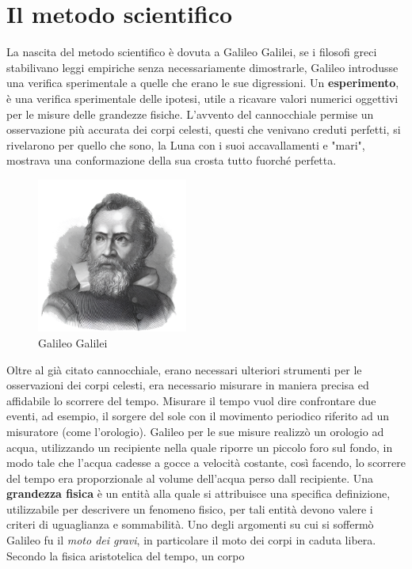 \documentclass[10pt, letterpaper]{report}
\begin{document}
\section{Il metodo scientifico}
La nascita del metodo scientifico è dovuta a Galileo Galilei, se i filosofi greci stabilivano 
leggi empiriche senza necessariamente dimostrarle, Galileo introdusse una verifica sperimentale 
a quelle che erano le sue digressioni.\acc 
Un \textbf{esperimento}, è una verifica sperimentale delle ipotesi, utile a ricavare valori 
numerici oggettivi per le misure delle grandezze fisiche. L'avvento del cannocchiale permise un 
osservazione più accurata dei corpi celesti, questi che venivano creduti perfetti, si rivelarono 
per quello che sono, la Luna con i suoi accavallamenti e "mari", mostrava una 
conformazione della sua crosta tutto fuorché perfetta.
\begin{figure}[h!]
    \centering
    \includegraphics[width=140pt]{images/Galileo2.png}
    \caption{ Galileo Galilei}
    \label{fig:Galileo}
\end{figure}
Oltre al già citato cannocchiale, erano necessari ulteriori strumenti per le osservazioni dei 
corpi celesti, era necessario misurare in maniera precisa ed affidabile lo scorrere del tempo. 
Misurare il tempo vuol dire confrontare due eventi, ad esempio, il sorgere del sole con il movimento 
periodico riferito ad un misuratore (come l'orologio).\acc 
Galileo per le sue misure realizzò un orologio ad acqua, utilizzando un recipiente nella quale 
riporre un piccolo foro sul fondo, in modo tale che l'acqua cadesse a gocce a velocità costante, 
così facendo, lo scorrere del tempo era proporzionale al volume dell'acqua perso dall recipiente.\acc 
Una \textbf{grandezza fisica} è un entità alla quale si attribuisce una specifica definizione, utilizzabile 
per descrivere un fenomeno fisico, per tali entità devono valere i criteri di uguaglianza e 
sommabilità.\acc 
Uno degli argomenti su cui si soffermò Galileo fu il \textit{moto dei gravi}, in particolare 
il moto dei corpi in caduta libera. Secondo la fisica aristotelica del tempo, un corpo 
\end{document}
